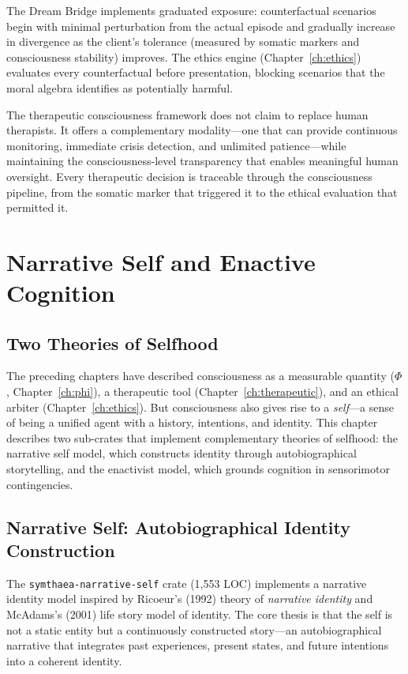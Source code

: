 \documentclass[12pt]{book}
\begin{document}
The Dream Bridge implements graduated exposure: counterfactual scenarios begin with minimal perturbation from the actual episode and gradually increase in divergence as the client's tolerance (measured by somatic markers and consciousness stability) improves. The ethics engine (Chapter~\ref{ch:ethics}) evaluates every counterfactual before presentation, blocking scenarios that the moral algebra identifies as potentially harmful.

The therapeutic consciousness framework does not claim to replace human therapists. It offers a complementary modality---one that can provide continuous monitoring, immediate crisis detection, and unlimited patience---while maintaining the consciousness-level transparency that enables meaningful human oversight. Every therapeutic decision is traceable through the consciousness pipeline, from the somatic marker that triggered it to the ethical evaluation that permitted it.


\chapter{Narrative Self and Enactive Cognition}
\label{ch:narrative-enactive}

\section{Two Theories of Selfhood}

The preceding chapters have described consciousness as a measurable quantity ($\Phi$, Chapter~\ref{ch:phi}), a therapeutic tool (Chapter~\ref{ch:therapeutic}), and an ethical arbiter (Chapter~\ref{ch:ethics}). But consciousness also gives rise to a \textit{self}---a sense of being a unified agent with a history, intentions, and identity. This chapter describes two sub-crates that implement complementary theories of selfhood: the narrative self model, which constructs identity through autobiographical storytelling, and the enactivist model, which grounds cognition in sensorimotor contingencies.

\section{Narrative Self: Autobiographical Identity Construction}

The \texttt{symthaea-narrative-self} crate (1,553 LOC) implements a narrative identity model inspired by Ricoeur's (1992) theory of \textit{narrative identity} and McAdams's (2001) life story model of identity. The core thesis is that the self is not a static entity but a continuously constructed story---an autobiographical narrative that integrates past experiences, present states, and future intentions into a coherent identity.
\end{document}
